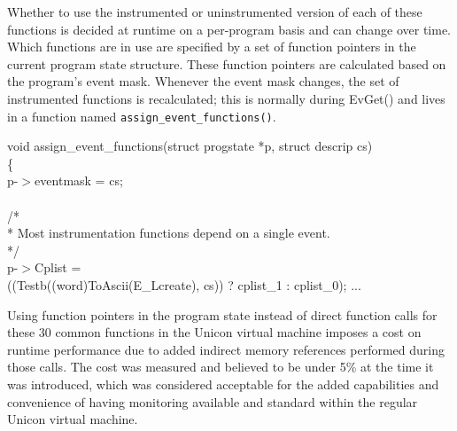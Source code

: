 Whether to use the instrumented or uninstrumented version of each of
these functions is decided at runtime on a per-program basis and can
change over time. Which functions are in use are specified by a set of
function pointers in the current program state structure.  These
function pointers are calculated based on the program's event mask.
Whenever the event mask changes, the set of instrumented functions is
recalculated; this is normally during EvGet() and lives in a function
named \texttt{assign\_event\_functions()}.

\begin{iconcode}
void assign\_event\_functions(struct progstate *p, struct descrip cs) \\
\{ \\
\>   p-$>$eventmask = cs; \\
\ \\
\>   /* \\
\>    * Most instrumentation functions depend on a single event. \\
\>    */ \\
\>   p-$>$Cplist = \\
\>\>      ((Testb((word)ToAscii(E\_Lcreate), cs)) ? cplist\_1 : cplist\_0);
\> ... \\
\end{iconcode}

Using function pointers in the program state instead of direct
function calls for these 30 common functions in the Unicon virtual
machine imposes a cost on runtime performance due to added indirect
memory references performed during those calls. The cost was measured
and believed to be under 5\% at the time it was introduced, which was
considered acceptable for the added capabilities and convenience of
having monitoring available and standard within the regular Unicon
virtual machine.
